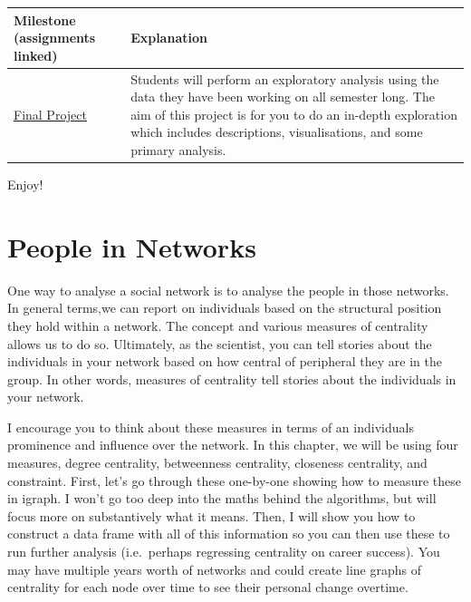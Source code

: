 \documentclass[
  letterpaper,
  DIV=11,
  numbers=noendperiod]{scrreprt}
\begin{document}
\begin{longtable}[]{@{}
  >{\raggedright\arraybackslash}p{}
  >{\raggedright\arraybackslash}p{}@{}}
\toprule\noalign{}
\begin{minipage}[b]{\linewidth}\raggedright
Milestone (assignments linked)
\end{minipage} & \begin{minipage}[b]{\linewidth}\raggedright
Explanation
\end{minipage} \\
\midrule\noalign{}
\endhead
\bottomrule\noalign{}
\endlastfoot
\href{Final\%20Project\%20Instructions.qmd}{Final Project} & Students
will perform an exploratory analysis using the data they have been
working on all semester long. The aim of this project is for you to do
an in-depth exploration which includes descriptions, visualisations, and
some primary analysis. ~ \\
\end{longtable}

Enjoy!

\chapter{People in Networks}\label{people-in-networks}

One way to analyse a social network is to analyse the people in those
networks. In general terms,we can report on individuals based on the
structural position they hold within a network. The concept and various
measures of centrality allows us to do so. Ultimately, as the scientist,
you can tell stories about the individuals in your network based on how
central of peripheral they are in the group. In other words, measures of
centrality tell stories about the individuals in your network.

I encourage you to think about these measures in terms of an individuals
prominence and influence over the network. In this chapter, we will be
using four measures, degree centrality, betweenness centrality,
closeness centrality, and constraint. First, let's go through these
one-by-one showing how to measure these in igraph. I won't go too deep
into the maths behind the algorithms, but will focus more on
substantively what it means. Then, I will show you how to construct a
data frame with all of this information so you can then use these to run
further analysis (i.e.~perhaps regressing centrality on career success).
You may have multiple years worth of networks and could create line
graphs of centrality for each node over time to see their personal
change overtime.
\end{document}
